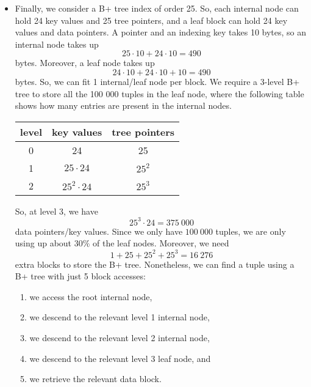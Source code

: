 \documentclass[a4paper, openany]{memoir}
\begin{document}
\begin{itemize}
    \item Finally, we consider a B+ tree index of order 25. So, each internal node can hold 24 key values and 25 tree pointers, and a leaf block can hold 24 key values and data pointers. A pointer and an indexing key takes 10 bytes, so an internal node takes up
    \[25 \cdot 10 + 24 \cdot 10 = 490\]
    bytes. Moreover, a leaf node takes up
    \[24 \cdot 10 + 24 \cdot 10 + 10 = 490\]
    bytes. So, we can fit 1 internal/leaf node per block. We require a 3-level B+ tree to store all the 100 000 tuples in the leaf node, where the following table shows how many entries are present in the internal nodes.
    \begin{table}[H]
        \centering
        \begin{tabular}{|c|c|c|}
            \hline
            level & key values & tree pointers \\
            \hline
            0 & 24 & 25 \\
            1 & $25 \cdot 24$ & $25^2$ \\
            2 & $25^2 \cdot 24$ & $25^3$ \\
            \hline
        \end{tabular}
    \end{table}
    So, at level 3, we have
    \[25^3 \cdot 24 = 375 \ 000\]
    data pointers/key values. Since we only have $100 \ 000$ tuples, we are only using up about $30\%$ of the leaf nodes. Moreover, we need
    \[1 + 25 + 25^2 + 25^3 = 16 \ 276\]
    extra blocks to store the B+ tree. Nonetheless, we can find a tuple using a B+ tree with just 5 block accesses:
    \begin{enumerate}
        \item we access the root internal node, 
        \item we descend to the relevant level 1 internal node,
        \item we descend to the relevant level 2 internal node,
        \item we descend to the relevant level 3 leaf node, and
        \item we retrieve the relevant data block.
    \end{enumerate}
\end{itemize}
\end{document}
